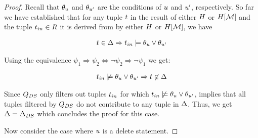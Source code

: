 \begin{proof}
 Recall that $\theta_{u}$ and $\theta_{u'}$  are the conditions of $u$ and $u'$, respectively.  So far we have established that for any tuple $t$ in the result of either $H$ or $H[\mathcal{M}]$ and the tuple $t_{in} \in R$ it is derived from by either $H$ or $H[\mathcal{M}]$, we have

 \begin{align}
t \in \Delta \Rightarrow t_{in} \models \theta_{u} \lor \theta_{u'}
 \end{align}

Using the equivalence $\psi_1 \Rightarrow \psi_2 \Leftrightarrow \neg \psi_2 \Rightarrow \neg \psi_1$ we get:

 \begin{align}
   t_{in} \not\models \theta_{u} \lor \theta_{u'} \Rightarrow t \not\in \Delta
    \label{eq:update-slicing-cond}
 \end{align}

Since $Q_{DS}$ only filters out tuples $t_{in}$ for which $t_{in} \not \models \theta_{u} \lor \theta_{u'}$,   implies that all tuples filtered by $Q_{DS}$ do not contribute to any tuple in $\Delta$. Thus, we get $\Delta = \Delta_{DS}$ which concludes the proof for this case.







%
%
%
%
%
%
%

%

%
%
%
%
%

\proofpar{$\up = \adelete$:}
%
%
Now consider the case where $u$ is a delete statement.



\end{proof}
